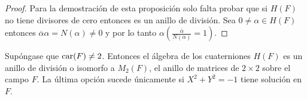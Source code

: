 \begin{proof}
Para la demostración de esta proposición solo falta probar que si $H(F)$ no tiene divisores de cero entonces es un anillo de división. Sea $0 \neq \alpha \in H(F)$ entonces $\overline{\alpha}\alpha = N(\alpha) \neq 0$ y por lo tanto $\alpha\left( \frac{\overline{\alpha}}{N(\alpha)} = 1\right)$.
\end{proof}

\begin{teorema}\label{teo:caracterizacion}
Supóngase que $\operatorname{car}(F) \neq 2$. Entonces el álgebra de los cuaterniones $H(F)$ es un anillo de división o isomorfo a $M_2(F)$, el anillo de matrices de $2\times 2$ sobre el campo $F$. La última opción sucede únicamente si $X^2 + Y^2 = -1$ tiene solución en $F$.
\end{teorema}

